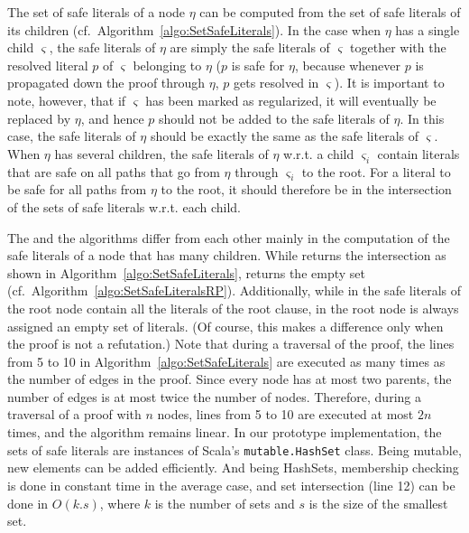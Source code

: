 The set of safe literals of a node $\eta$ can be computed from the set of safe
literals of its children (cf.\ Algorithm~\ref{algo:SetSafeLiterals}). In the case when $\eta$ has a single child $\varsigma$, the safe literals of $\eta$ are simply the safe literals of $\varsigma$ together with the resolved literal $p$ of $\varsigma$ belonging to $\eta$ ($p$ is safe for $\eta$, because whenever $p$ is propagated down the proof through $\eta$, $p$ gets resolved in $\varsigma$). It is important to note, however, that if $\varsigma$ has been marked as regularized, it will eventually be replaced by $\eta$, and hence $p$ should not be added to the safe literals of $\eta$. In this case, the safe literals of $\eta$ should be exactly the same as the safe literals of $\varsigma$. When $\eta$ has several children, the safe literals of $\eta$ w.r.t. a child $\varsigma_i$ contain literals that are safe on all paths that go from $\eta$ through $\varsigma_i$ to the root. For a literal to be safe for all paths from $\eta$ to the root, it should therefore be in the intersection of the sets of safe literals w.r.t. each child.


The {\RP} and the {\RPI} algorithms differ from each other mainly in the
computation of the safe literals of a node that has many children. While {\RPI}
returns the intersection as shown in Algorithm~\ref{algo:SetSafeLiterals}, {\RP}
returns the empty set (cf.\ Algorithm~\ref{algo:SetSafeLiteralsRP}). Additionally, while in {\RPI} the safe literals of the root node contain all the literals of the root clause, in {\RP} the root node is always assigned an empty set of literals. 
(Of course, this makes a difference only when the proof is not a refutation.)
Note that during a traversal of the proof, 
the lines from 5 to 10 in Algorithm~\ref{algo:SetSafeLiterals} are executed as many times as the number of edges in the proof. 
Since every node has at most two parents, the number of edges is at most twice the number of nodes. 
Therefore, during a traversal of a proof with $n$ nodes, lines from 5 to 10 are
executed at most $2n$ times, and the algorithm remains linear.
In our prototype implementation, the sets of safe literals are instances of Scala's 
\texttt{mutable.HashSet} class. Being mutable, new elements can be added efficiently.
And being HashSets, membership checking is done in constant time in the average case, 
and set intersection (line 12) can be done in $O(k.s)$, where $k$ is the number of sets and $s$ is the size of the smallest set.



